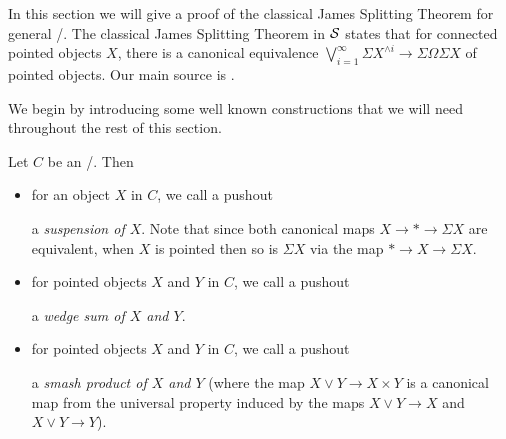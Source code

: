 In this section we will give a proof of the classical James Splitting Theorem \cite{james_splitting_original} for general \inftytops/.
The classical James Splitting Theorem in $\mathcal{S}$ states that for connected pointed objects $X$, there is a canonical equivalence $\bigvee\limits_{i=1}^{\infty}\Sigma X^{\wedge i}\to\Sigma\Omega\Sigma X$ of pointed objects.
Our main source is \cite[\S 2.2 and \S 4]{splittings_21}.

We begin by introducing some well known constructions that we will need throughout the rest of this section.
\begin{definition}
    Let $C$ be an \inftytop/.
    Then 
    \begin{itemize}
        \item for an object $X$ in $C$, we call a pushout
        \begin{center}
        \end{center}
        a \emph{suspension of $X$}. 
        Note that since both canonical maps $X\to *\to \Sigma X$ are equivalent, when $X$ is pointed then so is $\Sigma X$ via the map $*\to X\to\Sigma X$.
        \item for pointed objects $X$ and $Y$ in $C$, we call a pushout
        \begin{center}
        \end{center}
        a \emph{wedge sum of $X$ and $Y$}.
        \item for pointed objects $X$ and $Y$ in $C$, we call a pushout
        \begin{center}
        \end{center}
        a \emph{smash product of $X$ and $Y$} (where the map $X\vee Y\to X\times Y$ is a canonical map from the universal property induced by the maps $X\vee Y\to X$ and $X\vee Y\to Y$).
    \end{itemize}
\end{definition}
